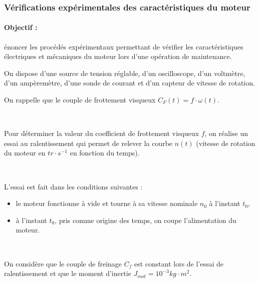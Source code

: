 
\subsubsection{Vérifications expérimentales des caractéristiques du moteur}

\paragraph{Objectif :} énoncer les procédés expérimentaux permettant de vérifier les caractéristiques électriques et mécaniques du moteur lors d'une opération de maintenance.

\newpage

On dispose d'une source de tension réglable, d'un oscilloscope, d'un voltmètre, d'un ampèremètre, d'une sonde de courant et d'un capteur de vitesse de rotation.


On rappelle que le couple de frottement visqueux $C_F(t)=f\cdot\omega(t)$.

~\

Pour déterminer la valeur du coefficient de frottement visqueux $f$, on réalise un essai au ralentissement qui permet de relever la courbe $n(t)$ (vitesse de rotation du moteur en $tr\cdot s^{-1}$ en fonction du temps).

~\

L'essai est fait dans les conditions suivantes :
\begin{itemize}
 \item le moteur fonctionne à vide et tourne à sa vitesse nominale $n_0$ à l'instant $t_0$,
 \item à l'instant $t_0$, pris comme origine des temps, on coupe l'alimentation du moteur.
\end{itemize}
~\

On considère que le couple de freinage $C_f$ est constant lors de l'essai de ralentissement et que le moment d'inertie $J_{mot}=10^{-3}kg\cdot m^2$.

